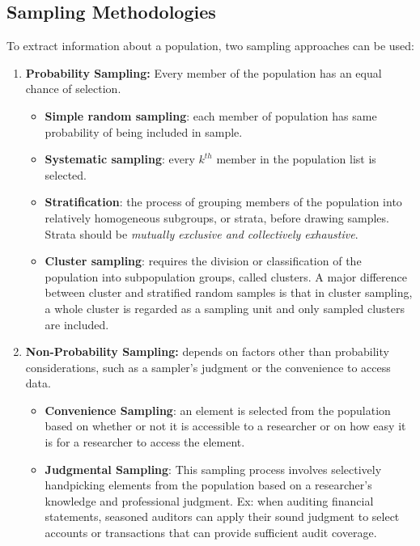 \subsection{Sampling Methodologies}
	\label{subsec:Sampling Methodologies}
To extract information about a population, two sampling approaches can be used:
\begin{enumerate}
	\item \textbf{Probability Sampling:} Every member of the population has an equal chance of selection.
	      \begin{itemize}
		      \item \textbf{Simple random sampling}: each member of population has same probability of being included in sample.
			  \item \textbf{Systematic sampling}: every $k^{th}$ member in the population list is selected.
			  \item \textbf{Stratification}: the process of grouping members of the population into relatively homogeneous subgroups, or strata, before drawing samples. Strata should be \textit{mutually exclusive and collectively exhaustive}.
			  \item \textbf{Cluster sampling}: requires the division or classification of the population into subpopulation groups, called clusters. A major difference between cluster and stratified random samples is that in cluster sampling, a whole cluster is regarded as a sampling unit and only sampled clusters are included.
	      \end{itemize}
	\item \textbf{Non-Probability Sampling:} depends on factors other than probability considerations, such as a sampler's judgment or the convenience to access data.
	      \begin{itemize}
		      \item \textbf{Convenience Sampling}: an element is selected from the population based on whether or not it is accessible to a researcher or on how easy it is for a researcher to access the element.
			  \item \textbf{Judgmental Sampling}: This sampling process involves selectively handpicking elements from the population based on a researcher’s knowledge and professional judgment. Ex: when auditing financial statements, seasoned auditors can apply their sound judgment to select accounts or transactions that can provide sufficient audit coverage.
	      \end{itemize}
\end{enumerate}
